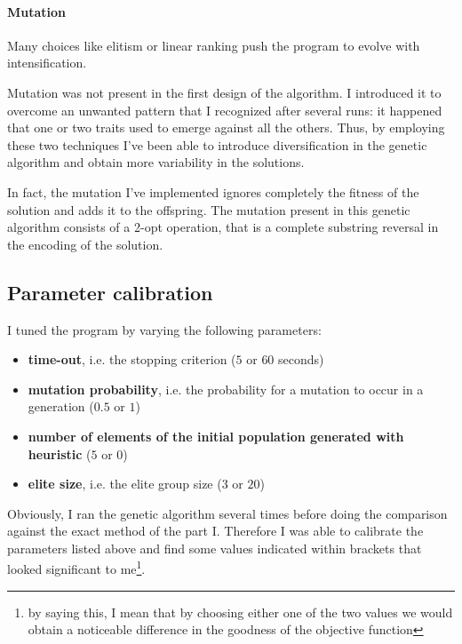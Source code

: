 \paragraph{Mutation} Many choices like elitism or linear ranking push the
program to evolve with intensification.

Mutation was not present in the first design of the algorithm. I introduced it
to overcome an unwanted pattern that I recognized after several runs: it
happened that one or two traits used to emerge against all the others. Thus, by employing these two techniques I've been able to introduce diversification
in the genetic algorithm and obtain more variability in the solutions.

In fact, the mutation I've implemented ignores completely the fitness of the
solution and adds it to the offspring. The mutation present in this genetic
algorithm consists of a 2-opt operation, that is a complete substring reversal
in the encoding of the solution.

\subsection{Parameter calibration} \label{sec:par-calib}

I tuned the program by varying the following parameters:

\begin{itemize}
	\item \textbf{time-out}, i.e. the stopping criterion ($5$ or $60$ seconds)
	\item \textbf{mutation probability}, i.e. the probability for a mutation to
		occur in a generation ($0.5$ or $1$)
	\item \textbf{number of elements of the initial population generated with
		heuristic} ($5$ or $0$)
	\item \textbf{elite size}, i.e. the elite group size ($3$ or $20$)
\end{itemize}

Obviously, I ran the genetic algorithm several times before doing the
comparison against the exact method of the part I. Therefore I was able to
calibrate the parameters listed above and find some values indicated within
brackets that looked significant to me\footnote{by saying this, I mean that
by choosing either one of the two values we would obtain a noticeable
difference in the goodness of the objective function}.





